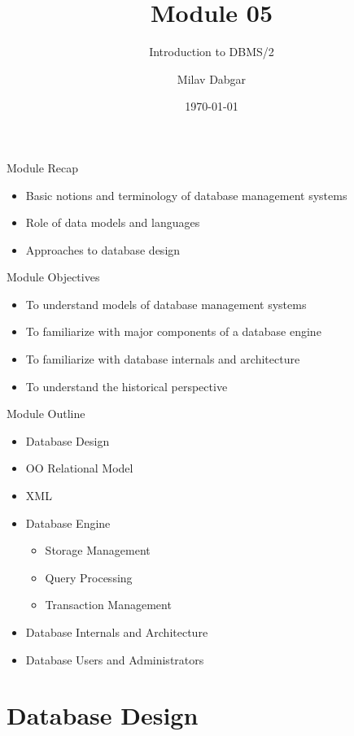 \documentclass[aspectratio=169, xcolor=dvipsnames]{beamer}
\title{Module 05}
\subtitle{Introduction to DBMS/2}
\author{Milav Dabgar}
\institute{www.milav.in}
\date{\today}
\begin{document}
\begin{frame}
    \titlepage
\end{frame}

\begin{frame}{Module Recap}
    \begin{itemize}
        \item Basic notions and terminology of database management systems
        \item Role of data models and languages
        \item Approaches to database design
    \end{itemize}
\end{frame}

\begin{frame}{Module Objectives}
    \begin{itemize}
        \item To understand models of database management systems
        \item To familiarize with major components of a database engine
        \item To familiarize with database internals and architecture
        \item To understand the historical perspective
    \end{itemize}
\end{frame}

\begin{frame}{Module Outline}
    \begin{itemize}[<+->]
        \item Database Design
        \item OO Relational Model
        \item XML
        \item Database Engine
        \begin{itemize}
            \item Storage Management
            \item Query Processing
            \item Transaction Management
        \end{itemize}
        \item Database Internals and Architecture
        \item Database Users and Administrators
    \end{itemize}
\end{frame}

\section{Database Design}
\end{document}
